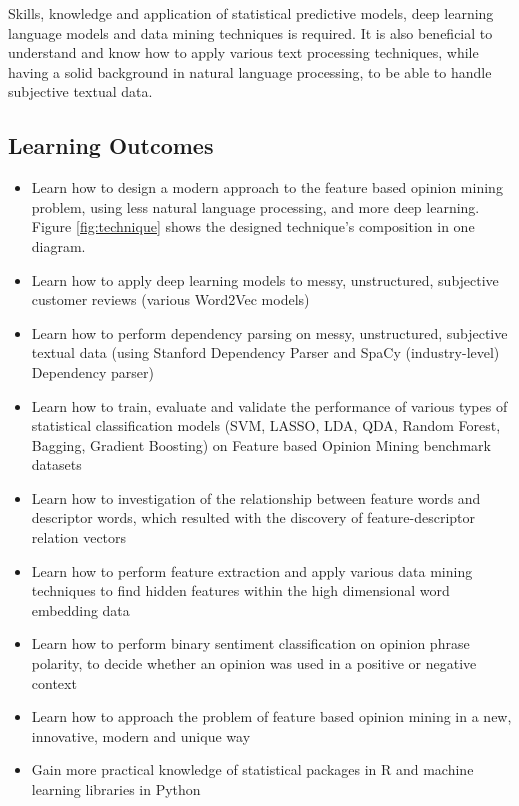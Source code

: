 \documentclass[12pt]{article} %
\begin{document}
Skills, knowledge and application of statistical predictive models, deep learning language models and data mining techniques is required. It is also beneficial to understand and know how to apply various text processing techniques, while having a solid background in natural language processing, to be able to handle subjective textual data.

\subsection{Learning Outcomes} %
\begin{itemize}
    \item Learn how to design a modern approach to the feature based opinion mining problem, using less natural language processing, and more deep learning. Figure \ref{fig:technique} shows the designed technique's composition in one diagram.
    \item Learn how to apply deep learning models to messy, unstructured, subjective customer reviews (various Word2Vec models)
    \item Learn how to perform dependency parsing on messy, unstructured, subjective textual data (using Stanford Dependency Parser and SpaCy (industry-level) Dependency parser)
    \item Learn how to train, evaluate and validate the performance of various types of statistical classification models (SVM, LASSO, LDA, QDA, Random Forest, Bagging, Gradient Boosting) on Feature based Opinion Mining benchmark datasets
    \item Learn how to investigation of the relationship between feature words and descriptor words, which resulted with the discovery of feature-descriptor relation vectors
    \item Learn how to perform feature extraction and apply various data mining techniques to find hidden features within the high dimensional word embedding data
    \item Learn how to perform binary sentiment classification on opinion phrase polarity, to decide whether an opinion was used in a positive or negative context 
    \item Learn how to approach the problem of feature based opinion mining in a new, innovative, modern and unique way
    \item Gain more practical knowledge of statistical packages in R and machine learning libraries in Python
  \end{itemize}
  
\end{document}
